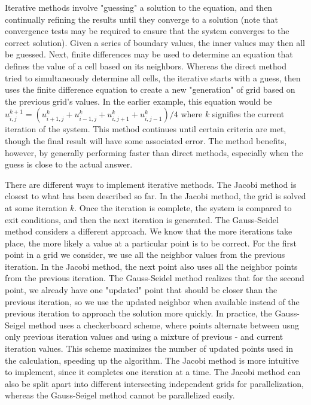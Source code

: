 \documentclass[twocolumn]{article}
\begin{document}
Iterative methods involve "guessing" a solution to the equation, and then continually refining the results until they converge to a solution (note that convergence tests may be required to ensure that the system converges to the correct solution). Given a series of boundary values, the inner values may then all be guessed. Next, finite differences may be used to determine an equation that defines the value of a cell based on its neighbors. Whereas the direct method tried to simultaneously determine all cells, the iterative starts with a guess, then uses the  finite difference equation to create a new "generation" of grid based on the previous grid's values. In the earlier example, this equation would be $u_{i,j}^{k+1} = (u_{i+1,j}^{k} + u_{i-1,j}^{k} + u_{i,j+1}^{k} + u_{i,j-1}^{k})/4 $ where $k$ signifies the current iteration of the system. This method continues until certain criteria are met, though the final result will have some associated error. The method benefits, however, by generally performing faster than direct methods, especially when the guess is close to the actual answer.

There are different ways to implement iterative methods. The Jacobi method is closest to what has been described so far. In the Jacobi method, the grid is solved at some iteration $k$. Once the iteration is complete, the system is compared to exit conditions, and then the next iteration is generated. The Gauss-Seidel method considers a different approach. We know that the more iterations take place, the more likely a value at a particular point is to be correct. For the first point in a grid we consider, we use all the neighbor values from the previous iteration. In the Jacobi method, the next point also uses all the neighbor points from the previous iteration. The Gauss-Seidel method realizes that for the second point, we already have one "updated" point that should be closer than the previous iteration, so we use the updated neighbor when available instead of the previous iteration to approach the solution more quickly. In practice, the Gauss-Seigel method uses a checkerboard scheme, where points alternate between usng only previous iteration values and using a mixture of previous -  and current iteration values. This scheme maximizes the number of updated points used in the calculation, speeding up the algorithm. The Jacobi method is more intuitive to implement, since it completes one iteration at a time. The Jacobi method can also be split apart into different intersecting independent grids for parallelization, whereas the Gauss-Seigel method cannot be parallelized easily.
\end{document}
